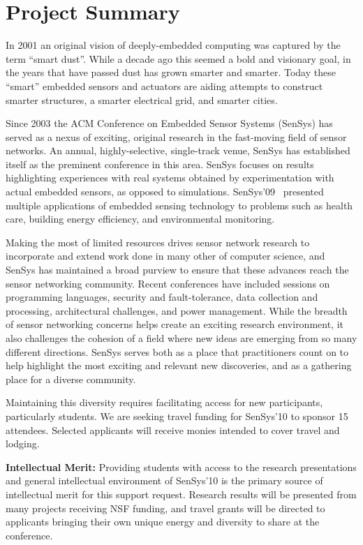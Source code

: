 \documentclass[11pt,letterpaper]{article}
\begin{document}
\section*{Project Summary}

In 2001 an original vision of deeply-embedded computing was captured by the
term ``smart dust''. While a decade ago this seemed a bold and visionary goal,
in the years that have passed dust has grown smarter and smarter. Today these
``smart'' embedded sensors and actuators are aiding attempts to construct
smarter structures, a smarter electrical grid, and smarter cities.

Since 2003 the ACM Conference on Embedded Sensor Systems (SenSys) has served
as a nexus of exciting, original research in the fast-moving field of sensor
networks. An annual, highly-selective, single-track venue, SenSys has
established itself as the preminent conference in this area.
SenSys focuses on results highlighting experiences with real systems obtained
by experimentation with actual embedded sensors, as opposed to simulations.
SenSys'09~\cite{sensys2009} presented multiple applications of embedded sensing technology to
problems such as health care, building energy efficiency, and environmental
monitoring.

Making the most of limited resources drives sensor network research to
incorporate and extend work done in many other of computer science, and
SenSys has maintained a broad purview to ensure that these advances reach the
sensor networking community. Recent conferences have included sessions on
programming languages, security and fault-tolerance, data collection and
processing, architectural challenges, and power management. While the breadth
of sensor networking concerns helps create an exciting research environment,
it also challenges the cohesion of a field where new ideas are emerging from
so many different directions. SenSys serves both as a place that
practitioners count on to help highlight the most exciting and relevant new
discoveries, and as a gathering place for a diverse community.

Maintaining this diversity requires facilitating access for new participants,
particularly students. We are seeking travel funding for SenSys'10 to sponsor
15 attendees. Selected applicants will receive monies intended to cover
travel and lodging.

\textbf{Intellectual Merit:} Providing students with access to the research
presentations and general intellectual environment of SenSys'10 is the
primary source of intellectual merit for this support request. Research
results will be presented from many projects receiving NSF funding, and
travel grants will be directed to applicants bringing their own unique energy
and diversity to share at the conference.
\end{document}
